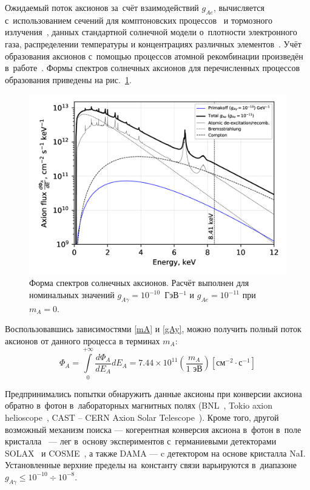 \documentclass[a4paper,article,14pt]{extarticle}
\begin{document}
Ожидаемый поток аксионов за~счёт взаимодействий $g_{Ae}$, вычисляется с~использованием сечений для комптоновских процессов~\cite{pospelov2008bosonic,gondolo2009solar} и тормозного излучения~\cite{brem}, данных стандартной солнечной модели о~плотности электронного газа, распределении температуры и концентрациях различных элементов~\cite{kekez2009search,derbin2011constraints}. Учёт образования аксионов с~помощью процессов атомной рекомбинации произведён в~работе~\cite{redondo2013solar}.
Формы спектров солнечных аксионов для перечисленных процессов образования приведены на рис.~\ref{fig:flux}.
\begin{figure}[t]
    \centering
    \includegraphics[width = .9\textwidth]{images/flux_solar.png}
    \caption{Форма спектров солнечных аксионов. Расчёт выполнен для номинальных значений $g_{A\gamma} = 10^{-10}$~ГэВ$^{-1}$ и $g_{Ae} = 10^{-11}$ при $m_A = 0$.}\label{fig:flux}
\end{figure}
Воспользовавшись зависимостями \eqref{mA} и \eqref{gAy}, можно получить полный поток аксионов от данного процесса в терминах $m_A$:
\begin{equation}
    \Phi_A =
    \int\limits_0^{+\infty} \frac{d\Phi_A}{dE_A} d{E_A} =
    7.44 \times 10^{11}
    \left(
    \frac{m_A}{1 \text{\ эВ}}
    \right)
    \left[
        \text{см}^{-2} \cdot \text{с}^{-1}
        \right]
\end{equation}

Предпринимались попытки обнаружить данные аксионы при конверсии аксиона обратно в~фотон в~лабораторных магнитных полях (BNL~\cite{lazarus1992search}, Tokio axion helioscope~\cite{moriyama1998direct,inoue2002search}, CAST -- CERN Axion Solar Telescope~\cite{beltran2005search}).
Кроме того, другой возможный механизм поиска --- когерентная конверсия аксиона в~фотон в~поле кристалла~\cite{paschos1994proposal} --- лег в~основу экспериментов с~германиевыми детекторами SOLAX~\cite{avignone1998first, avignone1999solar} и COSME~\cite{scopel1998theoretical,morales2002particle}, а также DAMA \cite{bernabei2001search} --- c детектором на основе кристалла NaI.
Установленные верхние пределы на~константу связи варьируются в~диапазоне $g_{A \gamma} \leqslant 10^{-10} \div 10^{-8}$.
\end{document}
